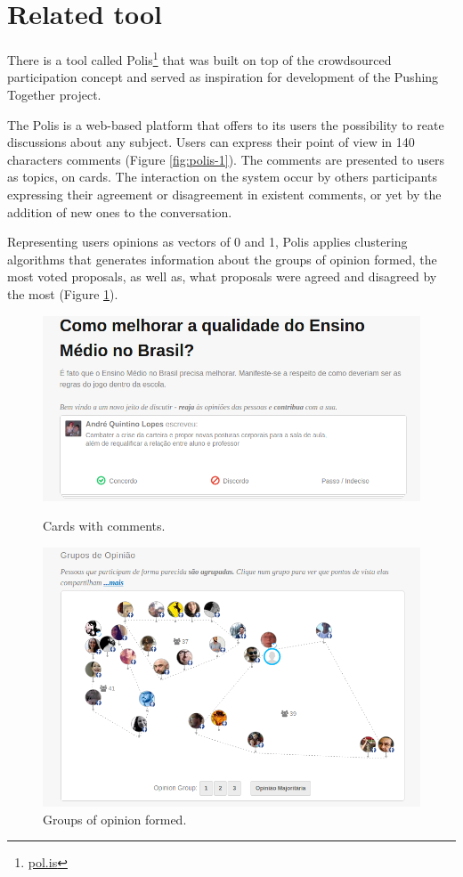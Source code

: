 \documentclass{llncs}
\begin{document}
\section{Related tool}

  There is a tool called Polis\footnote{\url{pol.is}} that was built
  on top of the crowdsourced participation concept and served as inspiration
  for development of the Pushing Together project.

  The Polis is a web-based platform that offers to its users the possibility to 
  reate discussions about any subject. Users can express their point of view
  in 140 characters comments (Figure \ref{fig:polis-1}). The comments are presented to users as topics,
  on cards. The interaction on the system occur by others participants expressing
  their agreement or disagreement in existent comments, or yet by the addition of
  new ones to the conversation. 

  Representing users opinions as vectors of 0 and 1, Polis applies clustering algorithms
  that generates information about the groups of opinion formed, the most voted
  proposals, as well as, what proposals were agreed and disagreed by the most (Figure \ref{fig:polis-2}). 

 \begin{figure}[hbt]
   \centering
   \begin{minipage}{.50\textwidth}
     \includegraphics[width=.9\linewidth]{images/polis1.png}
     \caption{Cards with comments.}
     \label{fig:polis-1}
   \end{minipage}
   \begin{minipage}{.49\textwidth}
     \includegraphics[width=.9\linewidth]{images/polis2.png}
     \caption{Groups of opinion formed.}
     \label{fig:polis-2}
   \end{minipage}
 \end{figure}
\end{document}
